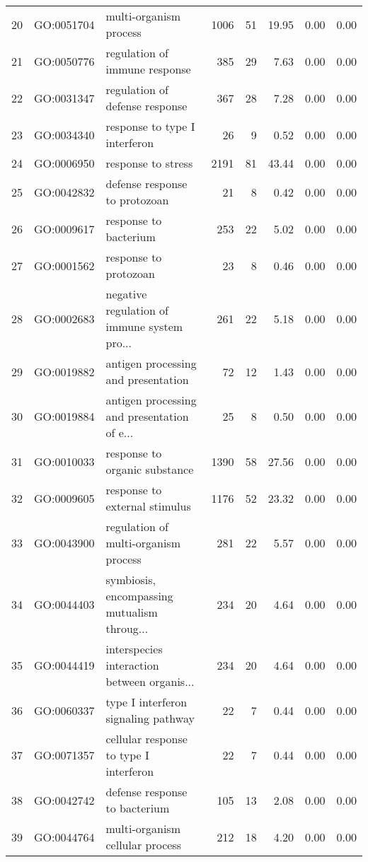 \begin{table}[ht]
\begin{tabular}{rllrrrrr}
  20 & GO:0051704 & multi-organism process & 1006 &  51 & 19.95 & 0.00 & 0.00 \\ 
  21 & GO:0050776 & regulation of immune response & 385 &  29 & 7.63 & 0.00 & 0.00 \\ 
  22 & GO:0031347 & regulation of defense response & 367 &  28 & 7.28 & 0.00 & 0.00 \\ 
  23 & GO:0034340 & response to type I interferon &  26 &   9 & 0.52 & 0.00 & 0.00 \\ 
  24 & GO:0006950 & response to stress & 2191 &  81 & 43.44 & 0.00 & 0.00 \\ 
  25 & GO:0042832 & defense response to protozoan &  21 &   8 & 0.42 & 0.00 & 0.00 \\ 
  26 & GO:0009617 & response to bacterium & 253 &  22 & 5.02 & 0.00 & 0.00 \\ 
  27 & GO:0001562 & response to protozoan &  23 &   8 & 0.46 & 0.00 & 0.00 \\ 
  28 & GO:0002683 & negative regulation of immune system pro... & 261 &  22 & 5.18 & 0.00 & 0.00 \\ 
  29 & GO:0019882 & antigen processing and presentation &  72 &  12 & 1.43 & 0.00 & 0.00 \\ 
  30 & GO:0019884 & antigen processing and presentation of e... &  25 &   8 & 0.50 & 0.00 & 0.00 \\ 
  31 & GO:0010033 & response to organic substance & 1390 &  58 & 27.56 & 0.00 & 0.00 \\ 
  32 & GO:0009605 & response to external stimulus & 1176 &  52 & 23.32 & 0.00 & 0.00 \\ 
  33 & GO:0043900 & regulation of multi-organism process & 281 &  22 & 5.57 & 0.00 & 0.00 \\ 
  34 & GO:0044403 & symbiosis, encompassing mutualism throug... & 234 &  20 & 4.64 & 0.00 & 0.00 \\ 
  35 & GO:0044419 & interspecies interaction between organis... & 234 &  20 & 4.64 & 0.00 & 0.00 \\ 
  36 & GO:0060337 & type I interferon signaling pathway &  22 &   7 & 0.44 & 0.00 & 0.00 \\ 
  37 & GO:0071357 & cellular response to type I interferon &  22 &   7 & 0.44 & 0.00 & 0.00 \\ 
  38 & GO:0042742 & defense response to bacterium & 105 &  13 & 2.08 & 0.00 & 0.00 \\ 
  39 & GO:0044764 & multi-organism cellular process & 212 &  18 & 4.20 & 0.00 & 0.00 \\ 

\end{tabular}
\end{table}
